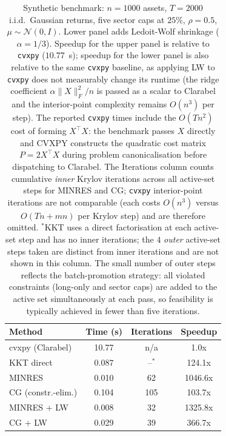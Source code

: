 \documentclass{siam/siamart}
\begin{document}
\begin{table}[ht]
\centering
\begin{tabular}{lccc}
\toprule
Method & Time (s) & Iterations & Speedup \\
\midrule
cvxpy (Clarabel)             & 10.77 & n/a &    1.0x \\
KKT direct                   & 0.087 &  --$^*$ &  124.1x \\
MINRES                        & 0.010 &  62 & 1046.6x \\
CG (constr.-elim.)            & 0.104 & 105 &  103.7x \\
\midrule
MINRES + LW                   & 0.008 &  32 & 1325.8x \\
CG + LW                       & 0.029 &  39 &  366.7x \\
\bottomrule
\end{tabular}
\caption{Synthetic benchmark: $n=1000$ assets, $T=2000$ i.i.d.\ Gaussian returns,
five sector caps at $25\%$, $\rho=0.5$, $\mu\sim\mathcal{N}(0,I)$.  Lower panel adds
Ledoit-Wolf shrinkage ($\alpha=1/3$).  Speedup for the upper panel is relative to
\texttt{cvxpy} ($10.77$~s); speedup for the lower panel is also relative to the same
\texttt{cvxpy} baseline, as applying LW to \texttt{cvxpy} does not measurably change
its runtime (the ridge coefficient $\alpha\|X\|_F^2/n$ is passed as a scalar to
Clarabel and the interior-point complexity remains $O(n^3)$ per step).  The reported \texttt{cvxpy} times include the $O(Tn^2)$
cost of forming $X^\top X$: the benchmark passes $X$ directly and CVXPY constructs
the quadratic cost matrix $P = 2X^\top X$ during problem canonicalisation before
dispatching to Clarabel.
The Iterations column counts cumulative \emph{inner} Krylov iterations across all
active-set steps for MINRES and CG; \texttt{cvxpy} interior-point iterations are not
comparable (each costs $O(n^3)$ versus $O(Tn + mn)$ per Krylov step) and are therefore
omitted.  $^*$KKT uses a direct factorisation at each active-set step and has no inner
iterations; the $4$ \emph{outer} active-set steps taken are distinct from inner
iterations and are not shown in this column.  The small number of outer steps
reflects the batch-promotion strategy: all violated constraints (long-only and
sector caps) are added to the active set simultaneously at each pass, so
feasibility is typically achieved in fewer than five iterations.}
\label{tab:synthetic}
\end{table}
\end{document}
